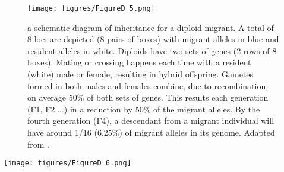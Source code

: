 \documentclass[10pt, twoside]{book} %
\begin{document}
	\begin{figure}[ht!]
		\begin{center}
			\texttt{[image: figures/FigureD\_5.png]}
		\end{center}
		\begin{footnotesize}
			\caption{a schematic diagram of inheritance for a diploid migrant. A total of 8 loci are depicted (8 pairs of boxes) with migrant alleles in blue and resident alleles in white. Diploids have two sets of genes (2 rows of 8 boxes). Mating or crossing happens each time with a resident (white) male or female, resulting in hybrid offspring. Gametes formed in both males and females combine, due to recombination, on average 50$\%$ of both sets of genes. This results each generation (F1, F2,...) in a reduction by 50$\%$ of the migrant alleles. By the fourth generation (F4), a descendant from a migrant individual will have around 1/16 (6.25$\%$) of migrant alleles in its genome. Adapted from \citet{patten2015}. \label{figD.5}}
		\end{footnotesize}
	\end{figure}

\clearpage
	\begin{sidewaysfigure}
		\begin{center}
			\texttt{[image: figures/FigureD\_6.png]}
		\end{center}
		\begin{footnotesize}
			\caption{a schematic diagram of inheritance for a migrant with a haplodiploid mating system. Inheritance in haplodiploids deviates from that in diploids: hybrids with 25$\%$ of migrant alleles can still occur in the third (F3) and fourth generation (F4), while this is limited to the second generation (F2) in diploids (Fig. \ref{figD.5}). A total of 8 loci are depicted (8 pairs of boxes) with migrant alleles in blue and resident alleles in white. A female has two sets of genes (2 rows of 8 boxes), males have one set of genes (1 row of 8 boxes). Mating or crossing happens each time with a resident (white) male or female, resulting in hybrid offspring. Males always transmit their complete genome to their daughters. Females transmit 50$\%$ of their genome to their offspring and their sons only inherit maternally derived set of genes, while daughters are the result of mating with a resident male. Due to this skewed inheritance of diploid females and haploid males, by the fourth generation, a descendant from a migrant individual will have between 1/16 (6.25$\%$) and 1/4 (25$\%$) of migrant alleles in its genome. Adapted from \citet{patten2015}. \label{figD.6}}
		\end{footnotesize}
		\end{sidewaysfigure}
	\clearpage
\end{document}
